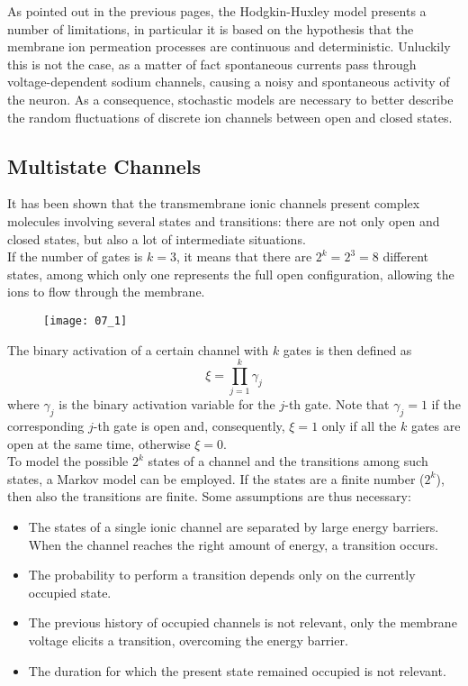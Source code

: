 As pointed out in the previous pages, the Hodgkin-Huxley model presents a number of
limitations, in particular it is based on the hypothesis that the membrane ion
permeation processes are continuous and deterministic. Unluckily this is not the case,
as a matter of fact spontaneous currents pass through voltage-dependent sodium channels,
causing a noisy and spontaneous activity of the neuron. As a consequence, stochastic models
are necessary to better describe the random fluctuations of discrete ion channels between
open and closed states.

\subsection{Multistate Channels}
It has been shown that the transmembrane ionic channels present complex molecules involving
several states and transitions: there are not only open and closed states, but also a
lot of intermediate situations.\\
If the number of gates is \(k=3\), it means that there are \(2^{k}=2^{3}=8\) different states,
among which only one represents the full open configuration, allowing the ions to flow
through the membrane.
\begin{figure}[H]
    \texttt{[image: 07\_1]}
    \centering
\end{figure}
The binary activation of a certain channel with \(k\) gates is then defined as
\begin{equation*}
    \xi=\prod_{j=1}^{k}\gamma_{j}
\end{equation*}
where \(\gamma_{j}\) is the binary activation variable for the \(j\)-th gate. Note that
\(\gamma_{j}=1\) if the corresponding \(j\)-th gate is open and, consequently, \(\xi=1\)
only if all the \(k\) gates are open at the same time, otherwise \(\xi=0\).\\
To model the possible \(2^{k}\) states of a channel and the transitions among such states,
a Markov model can be employed. If the states are a finite number (\(2^{k}\)), then also the
transitions are finite.\newpage
Some assumptions are thus necessary:
\begin{itemize}
    \item The states of a single ionic channel are separated by large energy barriers. When the
          channel reaches the right amount of energy, a transition occurs.
    \item The probability to perform a transition depends only on the currently occupied state.
    \item The previous history of occupied channels is not relevant, only the membrane voltage elicits
          a transition, overcoming the energy barrier.
    \item The duration for which the present state remained occupied is not relevant.
\end{itemize}
